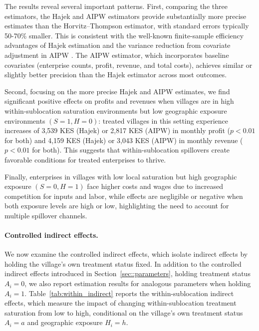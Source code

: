 \documentclass{article}
\begin{document}
The results reveal several important patterns. First, comparing the three estimators, the Hajek and AIPW estimators provide substantially more precise estimates than the Horvitz--Thompson estimator, with standard errors typically 50-70\% smaller. This is consistent with the well-known finite-sample efficiency advantages of Hajek estimation and the variance reduction from covariate adjustment in AIPW \citep{aronow2017estimating}. The AIPW estimator, which incorporates baseline covariates (enterprise counts, profit, revenue, and total costs), achieves similar or slightly better precision than the Hajek estimator across most outcomes.

Second, focusing on the more precise Hajek and AIPW estimates, we find significant positive effects on profits and revenues when villages are in high within-sublocation saturation environments but low geographic exposure environments $(S=1, H=0)$: treated villages in this setting experience increases of 3,539 KES (Hajek) or 2,817 KES (AIPW) in monthly profit ($p<0.01$ for both) and 4,159 KES (Hajek) or 3,043 KES (AIPW) in monthly revenue ($p<0.01$ for both). This suggests that within-sublocation spillovers create favorable conditions for treated enterprises to thrive. 

Finally, enterprises in villages with low local saturation but high geographic exposure $(S=0,H=1)$ face higher costs and wages due to increased competition for inputs and labor, while effects are negligible or negative when both exposure levels are high or low, highlighting the need to account for multiple spillover channels.

\paragraph{Controlled indirect effects.}

We now examine the controlled indirect effects, which isolate indirect effects by holding the village's own treatment status fixed. In addition to the controlled indirect effects introduced in Section~\ref{sec::parameters}, holding treatment status $A_i=0$, we also report estimation results for analogous parameters when holding $A_i=1$. Table~\ref{tab:within_indirect} reports the within-sublocation indirect effects, which measure the impact of changing within-sublocation treatment saturation from low to high, conditional on the village's own treatment status $A_i=a$ and geographic exposure $H_i=h$.
\end{document}
